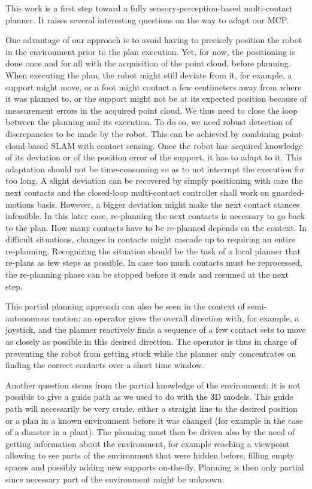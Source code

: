 This work is a first step toward a fully sensory-perception-based multi-contact planner.
It raises several interesting questions on the way to adapt our MCP\@.

One advantage of our approach is to avoid having to precisely position the robot in the environment prior to the plan execution.
Yet, for now, the positioning is done once and for all with the acquisition of the point cloud, before planning.
When executing the plan, the robot might still deviate from it, for example, a support might move, or a foot might contact a few centimeters away from where it was planned to, or the support might not be at its expected position because of measurement errors in the acquired point cloud.
We thus need to close the loop between the planning and its execution.
To do so, we need robust detection of discrepancies to be made by the robot.
This can be achieved by combining point-cloud-based SLAM with contact sensing.
Once the robot has acquired knowledge of its deviation or of the position error of the support, it has to adapt to it.
This adaptation should not be time-consuming so as to not interrupt the execution for too long.
A slight deviation can be recovered by simply positioning with care the next contacts and the closed-loop multi-contact controller shall work on guarded-motions basis.
However, a bigger deviation might make the next contact stances infeasible.
In this later case, re-planning the next contacts is necessary to go back to the plan.
How many contacts have to be re-planned depends on the context.
In difficult situations, changes in contacts might cascade up to requiring an entire re-planning.
Recognizing the situation should be the task of a local planner that re-plans as few steps as possible.
In case too much contacts must be reprocessed, the re-planning phase can be stopped before it ends and resumed at the next step.

This partial planning approach can also be seen in the context of semi-autonomous motion: an operator gives the overall direction with, for example, a joystick, and the planner reactively finds a sequence of a few contact sets to move as closely as possible in this desired direction.
The operator is thus in charge of preventing the robot from getting stuck while the planner only concentrates on finding the correct contacts over a short time window.

Another question stems from the partial knowledge of the environment: it is not possible to give a guide path as we used to do with the 3D models.
This guide path will necessarily be very crude, either a straight line to the desired position or a plan in a known environment before it was changed (for example in the case of a disaster in a plant).
The planning must then be driven also by the need of getting information about the environment, for example reaching a viewpoint allowing to see parts of the environment that were hidden before, filling empty spaces and possibly adding new supports on-the-fly.
Planning is then only partial since necessary part of the environment might be unknown.

